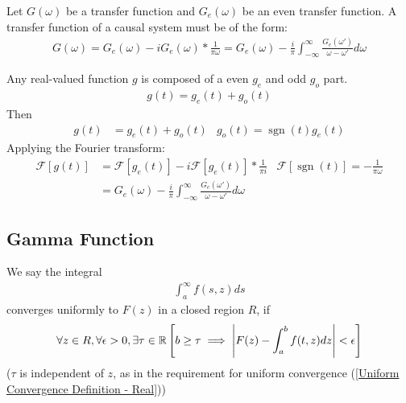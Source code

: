\documentclass[12pt, english]{book}
\makeatletter
\renewenvironment{proof}[1][\proofname]{\par
	\pushQED{\qed}%
	\normalfont \topsep6\p@\@plus6\p@\relax
	\list{}{%
		\settowidth{\leftmargin}{\itshape\proofname:\hskip\labelsep}%
		\setlength{\labelwidth}{0pt}%
		\setlength{\itemindent}{-\leftmargin}%
		}%
	\item[\hskip\labelsep\itshape#1\@addpunct{:}]\ignorespaces
	}{\popQED\endlist\@endpefalse}
\makeatother
\begin{document}
	\begin{theorem}
		\label{Hilbert Transform and Causal System Theorem - Complex}
		Let \(G(\omega)\) be a transfer function and \(G_e(\omega)\) be an even transfer function. A transfer function of a causal system must be of the form: 
		\begin{align*}
			G(\omega)= G_e(\omega) - iG_e(\omega) \ast \frac{1}{\pi \omega} 
				= G_e(\omega) - \frac{i}{\pi} \int_{-\infty}^{\infty} \frac{G_e(\omega')}{\omega - \omega'} d\omega
		\end{align*}
	\end{theorem}
	\begin{proof}
		Any real-valued function \(g\) is composed of a even \(g_e\) and odd \(g_o\) part.
		\begin{align*}
			g(t) = g_e(t) + g_o(t)
		\end{align*}
		Then
		\begin{align*}
			g(t) &= g_e (t) + g_o (t)	& g_o(t) = \operatorname{sgn}(t) g_e(t)
		\end{align*}
		Applying the Fourier transform:
		\begin{align*}
			\mathcal{F}[g(t)] 
			&= \mathcal{F}[g_e(t)] - i\mathcal{F}[g_e(t)] \ast \frac{1}{\pi i}
				& \mathcal{F}[\operatorname{sgn}(t)] = -\frac{1}{\pi \omega} \\
			&= G_e(\omega) - \frac{i}{\pi} \int_{-\infty}^{\infty} \frac{G_e(\omega')}{\omega - \omega'} d\omega
		\end{align*}
	\end{proof}
	
	\subsection{Gamma Function} \label{Gamma Function Subsection - Complex}
	
	\begin{definition}
		We say the integral
		\begin{align*}
			\int_{a}^{\infty} f(s, z) ds
		\end{align*}
		converges uniformly to \(F(z)\) in a closed region \(R\), if 
		\begin{align*}
			\forall z \in R, \forall \epsilon > 0, \exists \tau \in \mathbb{R}
			\left[b \geq \tau \implies \abs{F(z) - \int_{a}^{b} f(t,z) dz} < \epsilon \right]
		\end{align*}
		(\(\tau\) is independent of \(z\), as in the requirement for uniform convergence (\cref{Uniform Convergence Definition - Real}))
	\end{definition}
\end{document}
